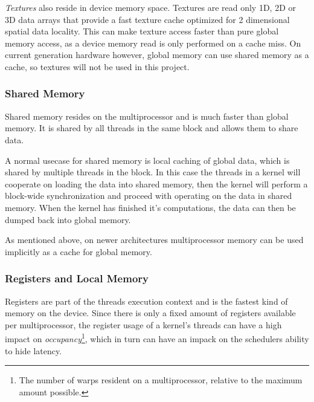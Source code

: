 \textit{Textures} also reside in device memory space. Textures are read only 1D,
2D or 3D data arrays that provide a fast texture cache optimized for 2
dimensional spatial data locality. This can make texture access faster than pure
global memory access, as a device memory read is only performed on a cache
miss. On current generation hardware however, global memory can use shared
memory as a cache, so textures will not be used in this project.

\subsubsection{Shared Memory}


Shared memory resides on the multiprocessor and is much faster than global
memory. It is shared by all threads in the same block and allows them to share
data.


A normal usecase for shared memory is local caching of global data, which is
shared by multiple threads in the block. In this case the threads in a kernel
will cooperate on loading the data into shared memory, then the kernel will
perform a block-wide synchronization and proceed with operating on the data in
shared memory. When the kernel has finished it's computations, the data can then
be dumped back into global memory.


As mentioned above, on newer architectures multiprocessor memory can be used
implicitly as a cache for global memory.




\subsubsection{Registers and Local Memory}


Registers are part of the threads execution context and is the fastest kind of
memory on the device. Since there is only a fixed amount of registers available
per multiprocessor, the register usage of a kernel's threads can have a high
impact on \textit{occupancy}\footnote{The number of warps resident on a
  multiprocessor, relative to the maximum amount possible.}, which in turn can
have an impack on the schedulers ability to hide latency.


